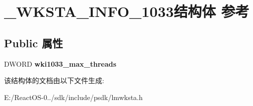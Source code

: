 \hypertarget{struct___w_k_s_t_a___i_n_f_o__1033}{}\section{\+\_\+\+W\+K\+S\+T\+A\+\_\+\+I\+N\+F\+O\+\_\+1033结构体 参考}
\label{struct___w_k_s_t_a___i_n_f_o__1033}
\subsection*{Public 属性}
\begin{DoxyCompactItemize}
\item 
\mbox{\label{struct___w_k_s_t_a___i_n_f_o__1033_a24f13209bb3fa8dcef315c33091d487f}} 
D\+W\+O\+RD {\bfseries wki1033\+\_\+max\+\_\+threads}
\end{DoxyCompactItemize}


该结构体的文档由以下文件生成\+:\begin{DoxyCompactItemize}
\item 
E\+:/\+React\+O\+S-\/0../sdk/include/psdk/lmwksta.\+h\end{DoxyCompactItemize}
